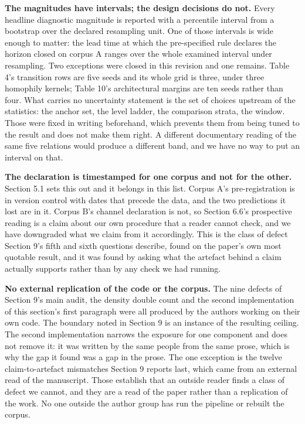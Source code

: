 \documentclass[twoside,11pt]{article}
\begin{document}
\textbf{The magnitudes have intervals; the design decisions do not.} Every headline diagnostic magnitude is reported with a percentile interval from a bootstrap over the declared resampling unit. One of those intervals is wide enough to matter: the lead time at which the pre-specified rule declares the horizon closed on corpus A ranges over the whole examined interval under resampling. Two exceptions were closed in this revision and one remains. Table 4's transition rows are five seeds and its whole grid is three, under three homophily kernels; Table 10's architectural margins are ten seeds rather than four. What carries no uncertainty statement is the set of choices upstream of the statistics: the anchor set, the level ladder, the comparison strata, the window. Those were fixed in writing beforehand, which prevents them from being tuned to the result and does not make them right. A different documentary reading of the same five relations would produce a different band, and we have no way to put an interval on that.

\textbf{The declaration is timestamped for one corpus and not for the other.} Section 5.1 sets this out and it belongs in this list. Corpus A's pre-registration is in version control with dates that precede the data, and the two predictions it lost are in it. Corpus B's channel declaration is not, so Section 6.6's prospective reading is a claim about our own procedure that a reader cannot check, and we have downgraded what we claim from it accordingly. This is the class of defect Section 9's fifth and sixth questions describe, found on the paper's own most quotable result, and it was found by asking what the artefact behind a claim actually supports rather than by any check we had running.

\textbf{No external replication of the code or the corpus.} The nine defects of Section 9's main audit, the density double count and the second implementation of this section's first paragraph were all produced by the authors working on their own code. The boundary noted in Section 9 is an instance of the resulting ceiling. The second implementation narrows the exposure for one component and does not remove it: it was written by the same people from the same prose, which is why the gap it found was a gap in the prose. The one exception is the twelve claim-to-artefact mismatches Section 9 reports last, which came from an external read of the manuscript. Those establish that an outside reader finds a class of defect we cannot, and they are a read of the paper rather than a replication of the work. No one outside the author group has run the pipeline or rebuilt the corpus.
\end{document}
